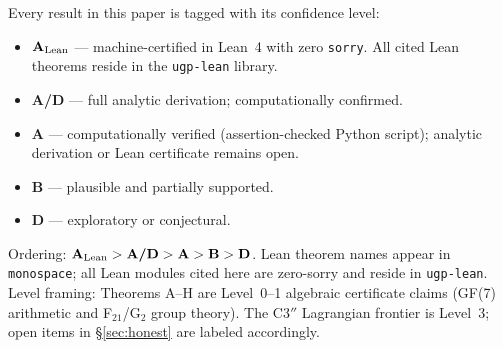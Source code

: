 \documentclass[11pt]{article}
\theoremstyle{remark}
\newcommand{\lean}[1]{%
  \penalty-100
  \begingroup\def\_{\textunderscore\allowbreak}\texttt{#1}\endgroup}
\newcommand{\CatA}{\textbf{A}}
\newcommand{\CatAL}{\ensuremath{\textbf{A}_{\rm Lean}}}
\newcommand{\CatAD}{\textbf{A/D}}
\newcommand{\CatB}{\textbf{B}}
\newcommand{\CatD}{\textbf{D}}
\begin{document}
\begin{abstract}
Two structurally independent derivation paths --- finite arithmetic (GTE) and
continuous division algebra --- converge on identical outputs $(N_c, \text{charge
spectrum}, N_{\mathrm{gen}}=3)$; this convergence constitutes non-trivial
structural evidence that these quantities are genuine consequences of
the GF(7) arithmetic rather than numerical accidents.
The neutrino sector is completed by the GTE seesaw: the right-handed seed ordering
$b_{R,1}=5<b_{R,2}=11<b_{R,3}=19$ pins the mass eigenstates $\nu_k$ via
$m_{\nu,k}\propto b_{R,k}^{29/9}$ and predicts normal ordering,
with $\Delta m^2_{21}$ and $\Delta m^2_{31}$ within $1\%$ of NuFIT~6.0~IC24~NH.
All major claims are certified at level \CatAL{} (zero \texttt{sorry} in Lean~4)
or \CatA{} (computation-verified by assertion-checked Python scripts).
\S\ref{sec:honest} lists what is not established.
\end{abstract}

\tableofcontents
\newpage

\begin{tcolorbox}[colback=gray!7,colframe=gray!55!black,
  title={\textbf{Claim-strength taxonomy}},
  fonttitle=\bfseries,left=6pt,right=6pt,top=5pt,bottom=5pt,breakable]
\small
Every result in this paper is tagged with its confidence level:
\begin{itemize}[noitemsep,topsep=2pt]
  \item \textbf{\CatAL} --- machine-certified in Lean~4 with zero \texttt{sorry}.
        All cited Lean theorems reside in the \texttt{ugp-lean} library.
  \item \textbf{\CatAD} --- full analytic derivation; computationally confirmed.
  \item \textbf{\CatA} --- computationally verified (assertion-checked Python script);
        analytic derivation or Lean certificate remains open.
  \item \textbf{\CatB} --- plausible and partially supported.
  \item \textbf{\CatD} --- exploratory or conjectural.
\end{itemize}
Ordering: $\CatAL > \CatAD > \CatA > \CatB > \CatD$.
Lean theorem names appear in \lean{monospace}; all Lean modules cited here are
zero-sorry and reside in \texttt{ugp-lean}.
Level framing: Theorems A--H are Level~0--1 algebraic certificate claims
(GF(7) arithmetic and F$_{21}$/G$_2$ group theory). The C$3''$ Lagrangian
frontier is Level~3; open items in \S\ref{sec:honest} are labeled accordingly.
\end{tcolorbox}
\end{document}
